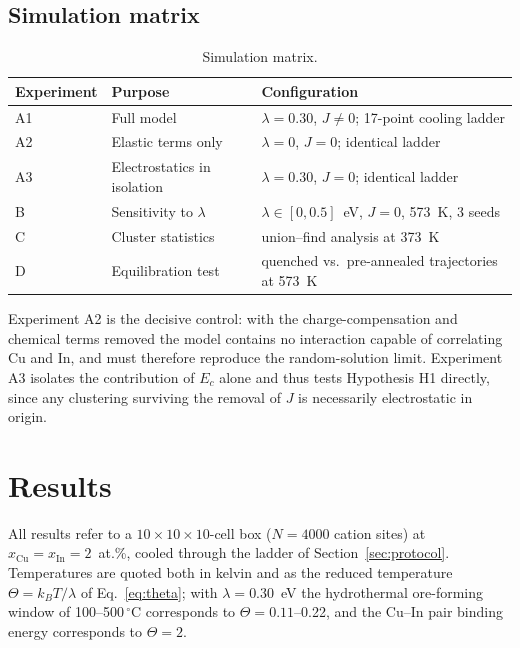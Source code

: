 \documentclass[11pt,a4paper]{article}
\begin{document}
\subsection{Simulation matrix}

\begin{table}[htbp]
\centering
\caption{Simulation matrix.}
\label{tab:matrix}
\small
\begin{tabular}{lll}
\toprule
Experiment & Purpose & Configuration \\
\midrule
A1 & Full model & $\lambda = 0.30$, $J \neq 0$; 17-point cooling ladder \\
A2 & Elastic terms only & $\lambda = 0$, $J = 0$; identical ladder \\
A3 & Electrostatics in isolation & $\lambda = 0.30$, $J = 0$; identical ladder \\
B & Sensitivity to $\lambda$ & $\lambda \in [0, 0.5]$~eV, $J = 0$, 573~K, 3 seeds \\
C & Cluster statistics & union--find analysis at 373~K \\
D & Equilibration test & quenched vs.\ pre-annealed trajectories at 573~K \\
\bottomrule
\end{tabular}
\end{table}

Experiment A2 is the decisive control: with the charge-compensation and chemical
terms removed the model contains no interaction capable of correlating Cu and
In, and must therefore reproduce the random-solution limit. Experiment A3
isolates the contribution of $E_c$ alone and thus tests Hypothesis H1 directly,
since any clustering surviving the removal of $J$ is necessarily electrostatic
in origin.

\section{Results}

All results refer to a $10\times10\times10$-cell box ($N = 4000$ cation sites)
at $x_{\mathrm{Cu}} = x_{\mathrm{In}} = 2$~at.\%, cooled through the ladder of
Section~\ref{sec:protocol}. Temperatures are quoted both in kelvin and as the
reduced temperature $\Theta = k_BT/\lambda$ of Eq.~\eqref{eq:theta}; with
$\lambda = 0.30$~eV the hydrothermal ore-forming window of
100--500$\,^\circ$C corresponds to $\Theta = 0.11$--0.22, and the Cu--In pair
binding energy corresponds to $\Theta = 2$.
\end{document}
